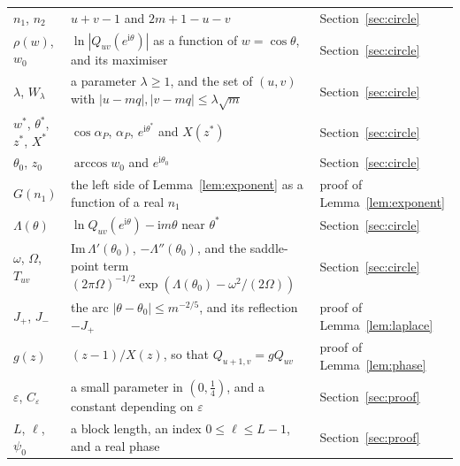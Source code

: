 \documentclass[11pt]{amsart}
\theoremstyle{remark}
\newcommand{\ii}{\mathrm{i}}
\begin{document}
\begin{longtable}{@{}>{\raggedright\arraybackslash}p{}>{\raggedright\arraybackslash}p{}>{\raggedright\arraybackslash}p{}@{}}
$n_1$, $n_2$ & $u+v-1$ and $2m+1-u-v$ & Section~\ref{sec:circle} \\
$\rho(w)$, $w_0$ & $\ln|Q_{uv}(e^{\ii\theta})|$ as a function of $w=\cos\theta$, and its maximiser & Section~\ref{sec:circle} \\
$\lambda$, $W_\lambda$ & a parameter $\lambda\ge1$, and the set of $(u,v)$ with $|u-mq|,|v-mq|\le\lambda\sqrt m$ & Section~\ref{sec:circle} \\
$w^*$, $\theta^*$, $z^*$, $X^*$ & $\cos\alpha_P$, $\alpha_P$, $e^{\ii\theta^*}$ and $X(z^*)$ & Section~\ref{sec:circle} \\
$\theta_0$, $z_0$ & $\arccos w_0$ and $e^{\ii\theta_0}$ & Section~\ref{sec:circle} \\
$G(n_1)$ & the left side of Lemma~\ref{lem:exponent} as a function of a real $n_1$ & proof of Lemma~\ref{lem:exponent} \\
$\Lambda(\theta)$ & $\ln Q_{uv}(e^{\ii\theta})-\ii m\theta$ near $\theta^*$ & Section~\ref{sec:circle} \\
$\omega$, $\Omega$, $T_{uv}$ & $\mathrm{Im}\,\Lambda'(\theta_0)$, $-\Lambda''(\theta_0)$, and the saddle-point term $(2\pi\Omega)^{-1/2}\exp(\Lambda(\theta_0)-\omega^2/(2\Omega))$ & Section~\ref{sec:circle} \\
$J_+$, $J_-$ & the arc $|\theta-\theta_0|\le m^{-2/5}$, and its reflection $-J_+$ & proof of Lemma~\ref{lem:laplace} \\
$g(z)$ & $(z-1)/X(z)$, so that $Q_{u+1,v}=gQ_{uv}$ & proof of Lemma~\ref{lem:phase} \\
$\varepsilon$, $C_\varepsilon$ & a small parameter in $(0,\frac14)$, and a constant depending on $\varepsilon$ & Section~\ref{sec:proof} \\
$L$, $\ell$, $\psi_0$ & a block length, an index $0\le\ell\le L-1$, and a real phase & Section~\ref{sec:proof} \\
\bottomrule
\end{longtable}
\end{document}
